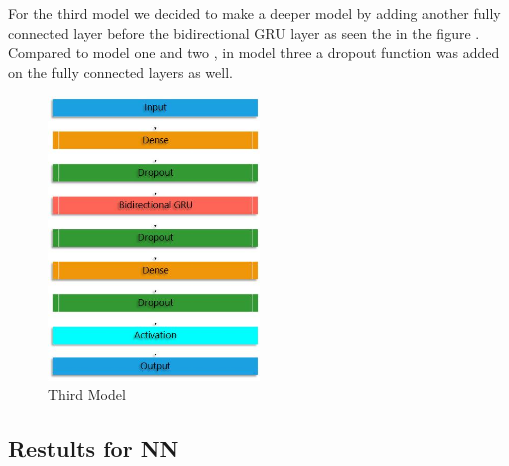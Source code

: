 For the third model we decided to make a deeper model by adding another fully connected layer before the bidirectional GRU layer as seen the in the figure . Compared to model one and two , in model three a dropout function was added on the fully connected layers as well.
\begin{figure}[htp]
	\centering
	\includegraphics[width=0.5\textwidth]{Illustrations/Model3.jpg}
	\caption{Third Model}
	\label{fig:thirdModel}
\end{figure}





\subsection{Restults for NN}




